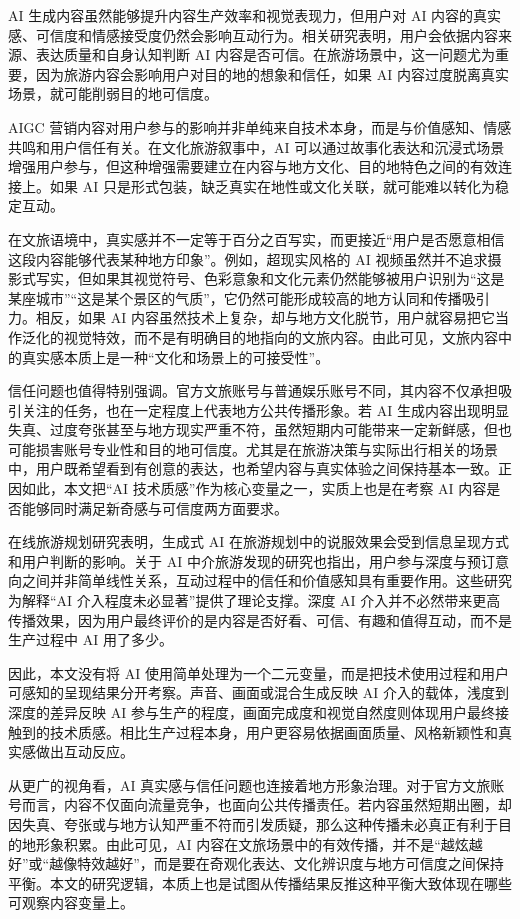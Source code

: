 AI 生成内容虽然能够提升内容生产效率和视觉表现力，但用户对 AI 内容的真实感、可信度和情感接受度仍然会影响互动行为。相关研究表明，用户会依据内容来源、表达质量和自身认知判断 AI 内容是否可信\cite{lit14}。在旅游场景中，这一问题尤为重要，因为旅游内容会影响用户对目的地的想象和信任，如果 AI 内容过度脱离真实场景，就可能削弱目的地可信度。

AIGC 营销内容对用户参与的影响并非单纯来自技术本身，而是与价值感知、情感共鸣和用户信任有关\cite{lit18}。在文化旅游叙事中，AI 可以通过故事化表达和沉浸式场景增强用户参与，但这种增强需要建立在内容与地方文化、目的地特色之间的有效连接上\cite{lit19}。如果 AI 只是形式包装，缺乏真实在地性或文化关联，就可能难以转化为稳定互动。

在文旅语境中，真实感并不一定等于百分之百写实，而更接近“用户是否愿意相信这段内容能够代表某种地方印象”。例如，超现实风格的 AI 视频虽然并不追求摄影式写实，但如果其视觉符号、色彩意象和文化元素仍然能够被用户识别为“这是某座城市”“这是某个景区的气质”，它仍然可能形成较高的地方认同和传播吸引力。相反，如果 AI 内容虽然技术上复杂，却与地方文化脱节，用户就容易把它当作泛化的视觉特效，而不是有明确目的地指向的文旅内容。由此可见，文旅内容中的真实感本质上是一种“文化和场景上的可接受性”。

信任问题也值得特别强调。官方文旅账号与普通娱乐账号不同，其内容不仅承担吸引关注的任务，也在一定程度上代表地方公共传播形象。若 AI 生成内容出现明显失真、过度夸张甚至与地方现实严重不符，虽然短期内可能带来一定新鲜感，但也可能损害账号专业性和目的地可信度。尤其是在旅游决策与实际出行相关的场景中，用户既希望看到有创意的表达，也希望内容与真实体验之间保持基本一致。正因如此，本文把“AI 技术质感”作为核心变量之一，实质上也是在考察 AI 内容是否能够同时满足新奇感与可信度两方面要求。

在线旅游规划研究表明，生成式 AI 在旅游规划中的说服效果会受到信息呈现方式和用户判断的影响\cite{lit27}。关于 AI 中介旅游发现的研究也指出，用户参与深度与预订意向之间并非简单线性关系，互动过程中的信任和价值感知具有重要作用\cite{lit28}。这些研究为解释“AI 介入程度未必显著”提供了理论支撑。深度 AI 介入并不必然带来更高传播效果，因为用户最终评价的是内容是否好看、可信、有趣和值得互动，而不是生产过程中 AI 用了多少。

因此，本文没有将 AI 使用简单处理为一个二元变量，而是把技术使用过程和用户可感知的呈现结果分开考察。声音、画面或混合生成反映 AI 介入的载体，浅度到深度的差异反映 AI 参与生产的程度，画面完成度和视觉自然度则体现用户最终接触到的技术质感。相比生产过程本身，用户更容易依据画面质量、风格新颖性和真实感做出互动反应。

从更广的视角看，AI 真实感与信任问题也连接着地方形象治理。对于官方文旅账号而言，内容不仅面向流量竞争，也面向公共传播责任。若内容虽然短期出圈，却因失真、夸张或与地方认知严重不符而引发质疑，那么这种传播未必真正有利于目的地形象积累。由此可见，AI 内容在文旅场景中的有效传播，并不是“越炫越好”或“越像特效越好”，而是要在奇观化表达、文化辨识度与地方可信度之间保持平衡。本文的研究逻辑，本质上也是试图从传播结果反推这种平衡大致体现在哪些可观察内容变量上。

